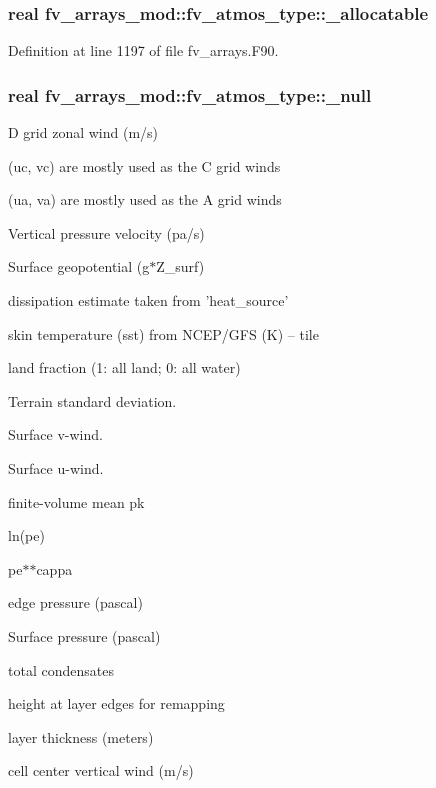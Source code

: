 \subsubsection[{\-\_\-allocatable}]{\setlength{\rightskip}{0pt plus 5cm}real fv\-\_\-arrays\-\_\-mod\-::fv\-\_\-atmos\-\_\-type\-::\-\_\-allocatable}\label{structfv__arrays__mod_1_1fv__atmos__type_a95b1ec35498953d190b394d9390b6a02}


Definition at line 1197 of file fv\-\_\-arrays.\-F90.

\subsubsection[{\-\_\-null}]{\setlength{\rightskip}{0pt plus 5cm}real fv\-\_\-arrays\-\_\-mod\-::fv\-\_\-atmos\-\_\-type\-::\-\_\-null}\label{structfv__arrays__mod_1_1fv__atmos__type_a6c2bbca5c19e33f65a51df86735d512a}


D grid zonal wind (m/s) 

(uc, vc) are mostly used as the C grid winds

(ua, va) are mostly used as the A grid winds

Vertical pressure velocity (pa/s)

Surface geopotential (g$\ast$\-Z\-\_\-surf)

dissipation estimate taken from 'heat\-\_\-source'

skin temperature (sst) from N\-C\-E\-P/\-G\-F\-S (K) -- tile

land fraction (1\-: all land; 0\-: all water)

Terrain standard deviation.

Surface v-\/wind.

Surface u-\/wind.

finite-\/volume mean pk

ln(pe)

pe$\ast$$\ast$cappa

edge pressure (pascal)

Surface pressure (pascal)

total condensates

height at layer edges for remapping

layer thickness (meters)

cell center vertical wind (m/s)

